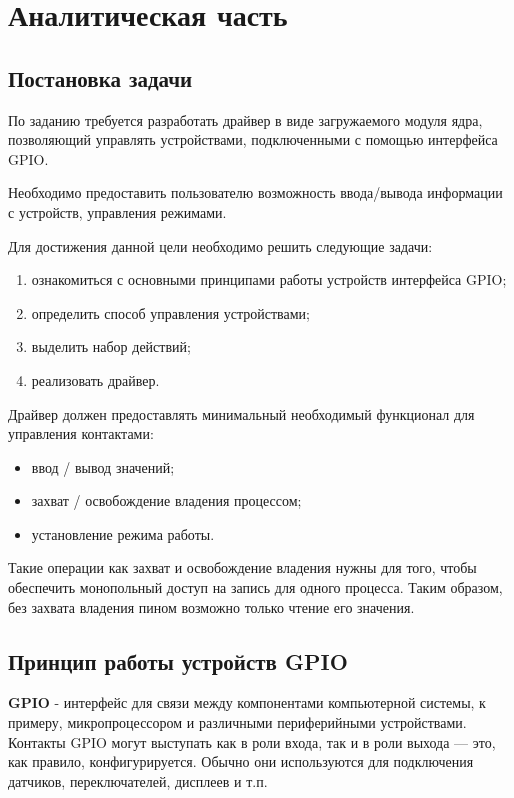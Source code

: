 \section{Аналитическая часть}

\subsection{Постановка задачи}\label{sec:task}
По заданию требуется разработать драйвер в виде загружаемого модуля ядра, позволяющий управлять устройствами, подключенными с помощью интерфейса GPIO.

Необходимо предоставить пользователю возможность ввода/вывода информации с устройств, управления режимами.

Для достижения данной цели необходимо решить следующие задачи:
\begin{enumerate}
	\item ознакомиться с основными принципами работы устройств интерфейса GPIO;
	\item определить способ управления устройствами;
	\item выделить набор действий;
	\item реализовать драйвер.
\end{enumerate}

Драйвер должен предоставлять минимальный необходимый функционал для управления контактами:
\begin{itemize}
	\item ввод / вывод значений;
	\item захват / освобождение владения процессом;
	\item установление режима работы.
\end{itemize} 

Такие операции как захват и освобождение владения нужны для того, чтобы обеспечить монопольный доступ на запись для одного процесса. Таким образом, без захвата владения пином возможно только чтение его значения.

\subsection{Принцип работы устройств GPIO}
\textbf{GPIO} - интерфейс для связи между компонентами компьютерной системы, к примеру, микропроцессором и различными периферийными устройствами\cite{subj:def}. Контакты GPIO могут выступать как в роли входа, так и в роли выхода — это, как правило, конфигурируется. Обычно они используются для подключения датчиков, переключателей, дисплеев и т.п.

